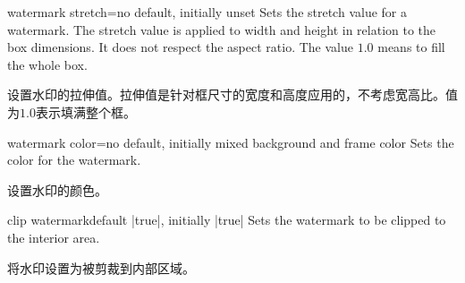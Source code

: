 \begin{docTcbKey}{watermark stretch}{=}{no default, initially unset}
Sets the stretch value for a watermark. The stretch value is applied to width
and height in relation to the box dimensions. It does not respect the aspect ratio.
The value $1.0$ means to fill the whole box.

设置水印的拉伸值。拉伸值是针对框尺寸的宽度和高度应用的，不考虑宽高比。值为$1.0$表示填满整个框。
\begin{dispExample}

\begin{tcolorbox}[title=Stretch 1.00,watermark stretch=1.00]
\lipsum[2]
\end{tcolorbox}\hfill%
\begin{tcolorbox}[title=Stretch 0.50,watermark stretch=0.50]
\lipsum[2]
\end{tcolorbox}%
\end{dispExample}
\end{docTcbKey}

\begin{docTcbKey}{watermark color}{=}{no default, initially mixed background and frame color}
Sets the color for the watermark.

设置水印的颜色。
\begin{dispExample}

\begin{tcolorbox}[enhanced,title=My title,watermark text=My Watermark,
watermark color=yellow!50!red]
\lipsum[1]
\end{tcolorbox}
\end{dispExample}
\end{docTcbKey}


\begin{docTcbKey}{clip watermark}{}{default |true|, initially |true|}
Sets the watermark to be clipped to the interior area.

将水印设置为被剪裁到内部区域。
\begin{dispExample}

\begin{tcolorbox}[title=Clip (default),clip watermark]
\lipsum[1]
\end{tcolorbox}

\begin{tcolorbox}[title=No clip,clip watermark=false]
\lipsum[1]
\end{tcolorbox}%
\end{dispExample}
\end{docTcbKey}
